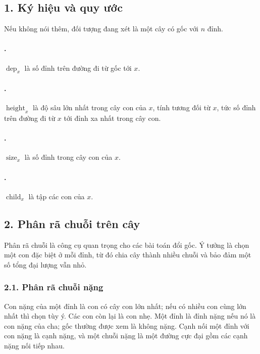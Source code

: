 \documentclass[11pt]{article}
\begin{document}
\subsection*{1. Ký hiệu và quy ước}

Nếu không nói thêm, đối tượng đang xét là một cây có gốc với \(n\) đỉnh.

\paragraph{.}
\(\operatorname{dep}_x\) là số đỉnh trên đường đi từ gốc tới \(x\).

\paragraph{.}
\(\operatorname{height}_x\) là độ sâu lớn nhất trong cây con của \(x\), tính
tương đối từ \(x\), tức số đỉnh trên đường đi từ \(x\) tới đỉnh xa nhất trong
cây con.

\paragraph{.}
\(\operatorname{size}_x\) là số đỉnh trong cây con của \(x\).

\paragraph{.}
\(\operatorname{child}_x\) là tập các con của \(x\).

\subsection*{2. Phân rã chuỗi trên cây}

Phân rã chuỗi là công cụ quan trọng cho các bài toán đổi gốc. Ý tưởng là chọn
một con đặc biệt ở mỗi đỉnh, từ đó chia cây thành nhiều chuỗi và bảo đảm một số
tổng đại lượng vẫn nhỏ.

\subsubsection*{2.1. Phân rã chuỗi nặng}

Con nặng của một đỉnh là con có cây con lớn nhất; nếu có nhiều con cùng lớn
nhất thì chọn tùy ý. Các con còn lại là con nhẹ. Một đỉnh là đỉnh nặng nếu nó
là con nặng của cha; gốc thường được xem là không nặng. Cạnh nối một đỉnh với
con nặng là cạnh nặng, và một chuỗi nặng là một đường cực đại gồm các cạnh nặng
nối tiếp nhau.
\end{document}
